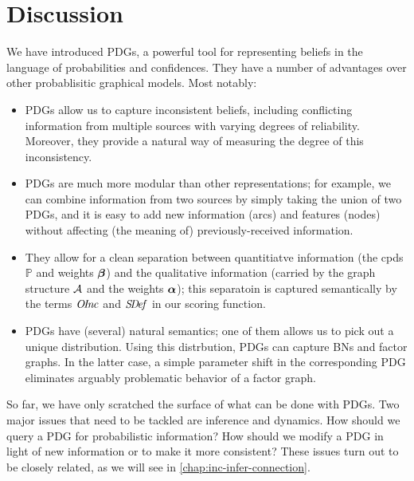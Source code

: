 \section{Discussion}
We have introduced PDGs, a powerful tool for representing
beliefs in the language of probabilities and confidences.
They have a number of advantages over other
    probablisitic graphical models. 
Most notably:
\begin{itemize}
\item PDGs allow us to capture inconsistent beliefs, including conflicting information from multiple sources with varying degrees of reliability.
    Moreover, they provide a natural way of measuring the degree of this inconsistency. 
\item 
	PDGs are much more modular 
	than other representations; for example, we can combine information from two sources by simply taking the union of two
	PDGs, and it is easy to add new information (arcs)
	and features (nodes) without affecting 
    (the meaning of)
    previously-received information.
\item They allow for a clean separation between quantitiatve information (the
	cpds $\mathbb P$ and weights $\boldsymbol\beta$) and the qualitative information (carried by
	the graph structure $\mathcal A$ and the weights $\boldsymbol\alpha$); 
	this separatoin is captured semantically by the
	terms $\mathit{O\mskip-2.5muI\mskip-3.5mun\mskip-1.7muc}$ and $\mathit{S\mskip-3.5muD\mskip-2.5mue\mskip-1.5muf}$ in our scoring function.
\item PDGs have (several) natural semantics; one of them allows us to
pick out a unique distribution.  Using this distrbution, PDGs
	can capture BNs and factor graphs.
    In the latter case, a simple parameter shift in the corresponding PDG eliminates arguably problematic behavior of a factor graph.
\end{itemize}

So far, we have only scratched the surface of what can be done with PDGs.
Two major issues that need to be tackled are inference and dynamics.
How should we query a PDG for probabilistic information? 
How should we modify a PDG in light of new information or to make it more consistent?
These issues turn out to be closely related, as we will see in 
    \cref{chap:inc-infer-connection}.


